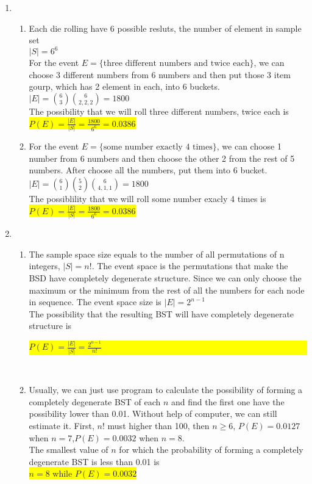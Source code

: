 \documentclass{article}
\begin{document}
\begin{enumerate}
\begin{enumerate}
	\end{enumerate}
	\item
	\begin{enumerate}
		\item
		Each die rolling have 6 possible resluts, the number of element in sample set\\
		${|S| = 6^6}$\\
		For the event ${E=\{\text{three different numbers and twice each}\}}$, we can choose 3 different numbers from 6 numbers and then put those 3 item gourp, which has 2 element in each, into 6 buckets.\\
		${|E|={6 \choose 3}{6 \choose 2,2,2}=1800}$\\
		\myansw
		The possibility that we will roll three different numbers, twice each is\\
		\colorbox{yellow}{
			${P(E)=\frac{|E|}{|S|}=\frac{1800}{6^6}=0.0386}$
		}\\
		\item
		For the event ${E=\{\text{some number exactly 4 times}\}}$, we can choose 1 number from 6 numbers and then choose the other 2 from the rest of 5 numbers. After choose all the numbers, put them into 6 bucket.\\
		${|E|={6 \choose 1}{5 \choose 2}{6 \choose 4, 1, 1}=1800}$\\
		\myansw
		The possiblility that we will roll some number exacly 4 times is\\
		\colorbox{yellow}{
			${P(E)=\frac{|E|}{|S|}=\frac{1800}{6^6}=0.0386}$
		}\\
	\end{enumerate}
	\item
	\begin{enumerate}
		\item
		\mysolu
		The sample space size equals to the number of all permutations of n integers, ${|S|=n!}$. The event space is the permutations that make the BSD have completely degenerate structure. Since we can only choose the maximum or the minimum from the rest of all the numbers for each node in sequence. The event space size is ${|E|=2^{n-1}}$\\
		\myansw
		The possibility that the resulting BST will have completely degenerate structure is\\
		\colorbox{yellow}{
			${P(E)=\frac{|E|}{|S|}=\frac{2^{n-1}}{n!}}$
			
		}\\
		\item
		\mysolu
		Usually, we can just use program to calculate the possibility of forming a completely degenerate BST of each ${n}$ and find the first one have the possibility lower than 0.01. Without help of computer, we can still estimate it. First, ${n!}$ must higher than 100, then ${n\geqslant6}$, ${P(E) = 0.0127}$  when ${n = 7}$,${P(E) = 0.0032}$ when ${ n = 8}$.\\
		\myansw
		The smallest value of ${n}$ for which the probability of forming a completely degenerate BST is less than 0.01 is\\
		\colorbox{yellow}{
			${n = 8}$ while ${P(E) = 0.0032}$
		}\\
		

\end{enumerate}
\end{enumerate}
\end{document}
